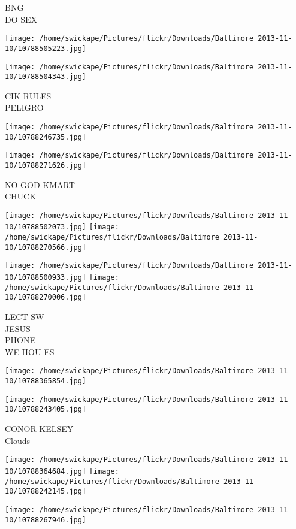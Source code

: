 \documentclass[10pt,letterpaper]{article}
\begin{document}
BNG\\
DO SEX
\pagebreak

\texttt{[image: /home/swickape/Pictures/flickr/Downloads/Baltimore 2013-11-10/10788505223.jpg]}

\vspace{0.25in}
\texttt{[image: /home/swickape/Pictures/flickr/Downloads/Baltimore 2013-11-10/10788504343.jpg]}

CIK RULES\\
PELIGRO
\pagebreak

\texttt{[image: /home/swickape/Pictures/flickr/Downloads/Baltimore 2013-11-10/10788246735.jpg]}

\vspace{0.25in}
\texttt{[image: /home/swickape/Pictures/flickr/Downloads/Baltimore 2013-11-10/10788271626.jpg]}

NO GOD KMART\\
CHUCK
\pagebreak

\texttt{[image: /home/swickape/Pictures/flickr/Downloads/Baltimore 2013-11-10/10788502073.jpg]}
\texttt{[image: /home/swickape/Pictures/flickr/Downloads/Baltimore 2013-11-10/10788270566.jpg]}

\texttt{[image: /home/swickape/Pictures/flickr/Downloads/Baltimore 2013-11-10/10788500933.jpg]}
\texttt{[image: /home/swickape/Pictures/flickr/Downloads/Baltimore 2013-11-10/10788270006.jpg]}

LECT SW\\
JESUS\\
PHONE\\
WE HOU ES
\pagebreak

\texttt{[image: /home/swickape/Pictures/flickr/Downloads/Baltimore 2013-11-10/10788365854.jpg]}

\vspace{0.25in}
\texttt{[image: /home/swickape/Pictures/flickr/Downloads/Baltimore 2013-11-10/10788243405.jpg]}

CONOR KELSEY\\
Clouds
\pagebreak

\texttt{[image: /home/swickape/Pictures/flickr/Downloads/Baltimore 2013-11-10/10788364684.jpg]}
\texttt{[image: /home/swickape/Pictures/flickr/Downloads/Baltimore 2013-11-10/10788242145.jpg]}

\vspace{0.25in}
\texttt{[image: /home/swickape/Pictures/flickr/Downloads/Baltimore 2013-11-10/10788267946.jpg]}
\end{document}
